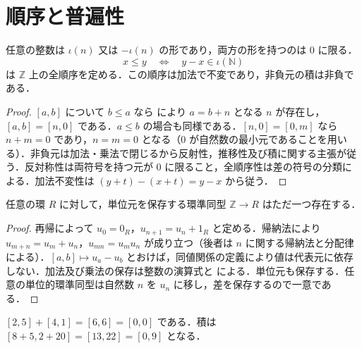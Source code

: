 \section{順序と普遍性}
\begin{prop}[整数の符号と順序]
任意の整数は $\iota(n)$ 又は $-\iota(n)$ の形であり，両方の形を持つのは $0$ に限る．
\[
x\leq y\quad\Longleftrightarrow\quad y-x\in\iota(\mathbb N)
\]
は $\mathbb Z$ 上の全順序を定める．この順序は加法で不変であり，非負元の積は非負である．
\end{prop}
\begin{proof}
$[a,b]$ について $b\leq a$ なら  により $a=b+n$ となる $n$ が存在し，$[a,b]=[n,0]$ である．$a\leq b$ の場合も同様である．$[n,0]=[0,m]$ なら $n+m=0$ であり，$n=m=0$ となる（$0$ が自然数の最小元であることを用いる）．非負元は加法・乗法で閉じるから反射性，推移性及び積に関する主張が従う．反対称性は両符号を持つ元が $0$ に限ること，全順序性は差の符号の分類による．加法不変性は $(y+t)-(x+t)=y-x$ から従う．
\end{proof}
\begin{prop}[整数環の普遍性]
任意の環 $R$ に対して，単位元を保存する環準同型 $\mathbb Z\to R$ はただ一つ存在する．
\end{prop}
\begin{proof}
再帰によって $u_0=0_R$，$u_{n+1}=u_n+1_R$ と定める．帰納法により $u_{m+n}=u_m+u_n$，$u_{mn}=u_mu_n$ が成り立つ（後者は $n$ に関する帰納法と分配律による）．$[a,b]\mapsto u_a-u_b$ とおけば，同値関係の定義により値は代表元に依存しない．加法及び乗法の保存は整数の演算式と  による．単位元も保存する．任意の単位的環準同型は自然数 $n$ を $u_n$ に移し，差を保存するので一意である．
\end{proof}
\begin{prop}[整数の差の計算]
$[2,5]+[4,1]=[6,6]=[0,0]$ である．積は $[8+5,2+20]=[13,22]=[0,9]$ となる．
\end{prop}
